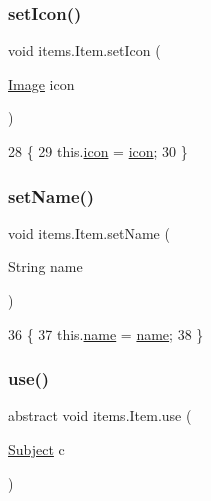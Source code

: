 \subsubsection{\texorpdfstring{set\+Icon()}{setIcon()}}
{\footnotesize\ttfamily void items.\+Item.\+set\+Icon (\begin{DoxyParamCaption}\item[{\mbox{\hyperlink{classorg_1_1newdawn_1_1slick_1_1_image}{Image}}}]{icon }\end{DoxyParamCaption})\hspace{0.3cm}{\ttfamily [inline]}}


\begin{DoxyCode}
28                                     \{
29         this.\mbox{\hyperlink{classitems_1_1_item_afa445ad011d48c3455b0c04bec2581f9}{icon}} = \mbox{\hyperlink{classitems_1_1_item_afa445ad011d48c3455b0c04bec2581f9}{icon}};
30     \}
\end{DoxyCode}
\mbox{\label{classitems_1_1_item_aff0a1e0692ec982287b25ee4528464cb}} 
\subsubsection{\texorpdfstring{set\+Name()}{setName()}}
{\footnotesize\ttfamily void items.\+Item.\+set\+Name (\begin{DoxyParamCaption}\item[{String}]{name }\end{DoxyParamCaption})\hspace{0.3cm}{\ttfamily [inline]}}


\begin{DoxyCode}
36                                      \{
37         this.\mbox{\hyperlink{classitems_1_1_item_a086327df1ba046bbbe3fa2f753226d73}{name}} = \mbox{\hyperlink{classitems_1_1_item_a086327df1ba046bbbe3fa2f753226d73}{name}};
38     \}
\end{DoxyCode}
\mbox{\label{classitems_1_1_item_a0829954625984ccd9f198c9be69e0302}} 
\subsubsection{\texorpdfstring{use()}{use()}}
{\footnotesize\ttfamily abstract void items.\+Item.\+use (\begin{DoxyParamCaption}\item[{\mbox{\hyperlink{classentities_1_1_subject}{Subject}}}]{c }\end{DoxyParamCaption})\hspace{0.3cm}{\ttfamily [abstract]}}



